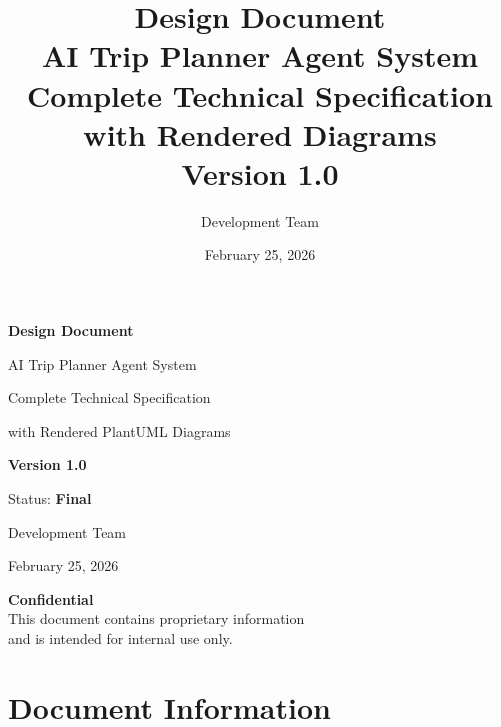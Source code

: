 \documentclass[12pt,a4paper]{report}
\title{%
    \Huge\textbf{Design Document}\\[0.5cm]
    \LARGE AI Trip Planner Agent System\\[0.3cm]
    \large Complete Technical Specification with Rendered Diagrams\\[1cm]
    \normalsize Version 1.0
}
\author{Development Team}
\date{February 25, 2026}
\begin{document}

\begin{titlepage}
    \centering
    \vspace*{1cm}
    
    {\Huge\textbf{Design Document}\par}
    \vspace{0.5cm}
    {\LARGE AI Trip Planner Agent System\par}
    \vspace{0.3cm}
    {\large Complete Technical Specification\par}
    {\large with Rendered PlantUML Diagrams\par}
    
    \vspace{2cm}
    
    {\Large\textbf{Version 1.0}\par}
    
    \vspace{1cm}
    
    {\large Status: \textbf{Final}\par}
    
    \vspace{2cm}
    
    {\Large Development Team\par}
    
    \vspace{1cm}
    
    {\large February 25, 2026\par}
    
    \vfill
    
    {\small\textbf{Confidential}\\
    This document contains proprietary information\\
    and is intended for internal use only.\par}
    
\end{titlepage}


\chapter*{Document Information}
\end{document}
